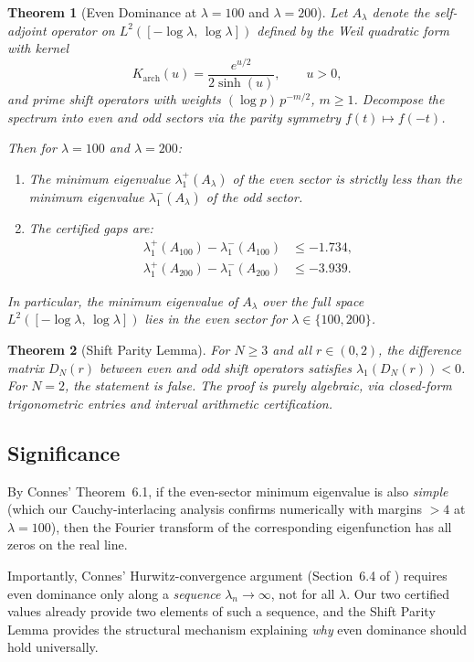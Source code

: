 \documentclass[12pt,a4paper]{article}
\newtheorem{theorem}{Theorem}[section]
\theoremstyle{definition}
\theoremstyle{remark}
\begin{document}
\begin{theorem}[Even Dominance at $\lambda = 100$ and $\lambda = 200$]
\label{thm:main}
Let $A_\lambda$ denote the self-adjoint operator on $L^2([-\log\lambda,\,\log\lambda])$ defined by the Weil quadratic form with kernel
\[
  K_{\mathrm{arch}}(u) = \frac{e^{u/2}}{2\sinh(u)}, \qquad u > 0,
\]
and prime shift operators with weights $(\log p)\,p^{-m/2}$, $m \geq 1$. Decompose the spectrum into even and odd sectors via the parity symmetry $f(t) \mapsto f(-t)$.

Then for $\lambda = 100$ and $\lambda = 200$:
\begin{enumerate}[label=(\roman*)]
  \item The minimum eigenvalue $\lambda_1^+(A_\lambda)$ of the even sector is strictly less than the minimum eigenvalue $\lambda_1^-(A_\lambda)$ of the odd sector.
  \item The certified gaps are:
  \begin{align*}
    \lambda_1^+(A_{100}) - \lambda_1^-(A_{100}) &\leq -1.734, \\
    \lambda_1^+(A_{200}) - \lambda_1^-(A_{200}) &\leq -3.939.
  \end{align*}
\end{enumerate}
In particular, the minimum eigenvalue of $A_\lambda$ over the full space $L^2([-\log\lambda,\,\log\lambda])$ lies in the even sector for $\lambda \in \{100, 200\}$.
\end{theorem}

\begin{theorem}[Shift Parity Lemma]
\label{thm:shift-parity-intro}
For $N \geq 3$ and all $r \in (0, 2)$, the difference matrix $D_N(r)$ between even and odd shift operators satisfies $\lambda_1(D_N(r)) < 0$. For $N = 2$, the statement is false. The proof is purely algebraic, via closed-form trigonometric entries and interval arithmetic certification.
\end{theorem}

\subsection{Significance}

By Connes' Theorem~6.1, if the even-sector minimum eigenvalue is also \emph{simple} (which our Cauchy-interlacing analysis confirms numerically with margins $> 4$ at $\lambda = 100$), then the Fourier transform of the corresponding eigenfunction has all zeros on the real line.

Importantly, Connes' Hurwitz-convergence argument (Section~6.4 of \cite{Connes2025}) requires even dominance only along a \emph{sequence} $\lambda_n \to \infty$, not for all $\lambda$. Our two certified values already provide two elements of such a sequence, and the Shift Parity Lemma provides the structural mechanism explaining \emph{why} even dominance should hold universally.
\end{document}
